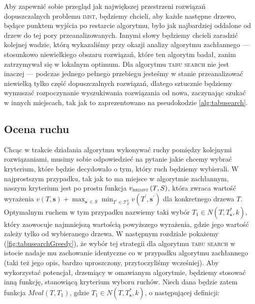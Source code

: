 Aby zapewnić sobie przegląd jak największej przestrzeni rozwiązań dopuszczalnych problemu \textsc{imst}, będziemy chcieli, aby każde następne drzewo, będące punktem wyjścia po restarcie algorytmu, było jak najbardziej oddalone od drzew do tej pory przeanalizowanych. Innymi słowy będziemy chcieli zaradzić kolejnej wadzie, którą wykazaliśmy przy okazji analizy algorytmu zachłannego --- stosunkowo niewielkiego obszaru rozwiązań, które ten algorytm badał, zanim zatrzymywał się w lokalnym optimum. Dla algorytmu \textsc{tabu search} nie jest inaczej --- podczas jednego pełnego przebiegu jesteśmy w stanie przeanalizować niewielką tylko część dopuszczalnych rozwiązań, dlatego sztucznie będziemy wymuszać rozpoczynanie wyszukiwania rozwiązania od nowa, zaczynając szukać w innych miejscach, tak jak to zaprezentowano na pseudokodzie \ref{alg:tabusearch}.

\subsection{Ocena ruchu}

Chcąc w trakcie działania algorytmu wykonywać ruchy pomiędzy kolejnymi rozwiązaniami, musimy sobie odpowiedzieć na pytanie jakie chcemy wybrać kryterium, które będzie decydowało o tym, który ruch będziemy wybierali. W najprostszym przypadku, tak jak to ma miejsce w algorytmie zachłannym, naszym kryterium jest po prostu funkcja $v_{\textsc{rrimst}} \left( T, S \right)$, która zwraca wartość wyrażenia $v \left( T, \textbf{s} \right) + \max_{\textbf{s}^{\prime} \in S} \min_{T^{\prime} \in \mathcal{T}^{k}_{T}} v \left( T^{\prime}, \textbf{s}^{\prime} \right)$ dla konkretnego drzewa $T$. Optymalnym ruchem w tym przypadku nazwiemy taki wybór $T_{1} \in N \left( T, T^{\ast}_{\textbf{s}}, k \right)$, który zaowocuje najmniejszą wartością powyższego wyrażenia, gdzie jego wartość zależy tylko od wybieranego drzewa. W następnym rozdziale pokażemy (\ref{fig:tabusearchGreedy}), że wybór tej strategii dla algorytmu \textsc{tabu search} w istocie nadaje mu zachowanie identyczne co w przypadku algorytmu zachłannego (taki też jego opis, bardzo uproszczony, przytoczyliśmy wcześniej). Aby wykorzystać potencjał, drzemiący w omawianym algorytmie, będziemy stosować inną funkcję, stanowiącą kryterium wyboru ruchów. Niech dana będzie zatem funkcja $Mval \left( T, T_{1} \right)$, gdzie $T_{1} \in N \left( T, T^{\ast}_{\textbf{s}}, k \right)$, o następującej definicji:

